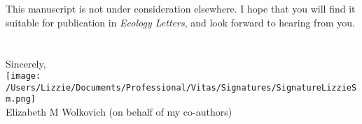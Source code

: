 \documentclass[11pt,a4paper]{letter}
\begin{document}
\begin{letter}{}
\\
\vspace{-1ex}\\
This manuscript is not under consideration elsewhere. I hope that you will find it suitable for publication in \emph{Ecology Letters}, and look forward to hearing from you.
\\
\\\vspace{-1ex}\\
\noindent Sincerely,\\

 \texttt{[image: /Users/Lizzie/Documents/Professional/Vitas/Signatures/SignatureLizzieSm.png]} \\

\noindent Elizabeth M Wolkovich (on behalf of my co-authors)

\end{letter}
\end{document}
